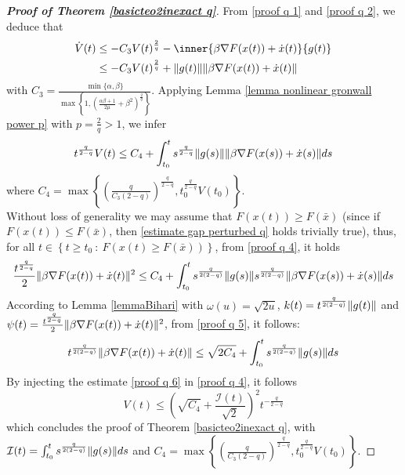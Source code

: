 \documentclass[reqno]{amsart}
\theoremstyle{plain}
\theoremstyle{definition}
\theoremstyle{remark}
\DeclarePairedDelimiter{\norm}{\lVert}{\rVert}	%
\newcommand{\Ib}{\mathcal{I}}
\begin{document}
\begin{proof}[\textbf{Proof of Theorem \ref{basicteo2inexact q}}]
	From \eqref{proof q 1} and \eqref{proof q 2}, we deduce that	
	\begin{equation}\label{proof q 3}
		\begin{aligned}
			\dot{V}(t) & \leq -C_{3}V(t)^{\frac{2}{q}}  -\inner{\beta\nabla F(x(t))+\dot{x}(t)}{g(t)} \\
			& \leq -C_{3}V(t)^{\frac{2}{q}} + \norm{g(t)}\norm{\beta\nabla F(x(t))+\dot{x}(t)}
		\end{aligned}
	\end{equation}
	with $C_{3}=\frac{\min\{\alpha,\beta\}}{\max\left\{1,\left(\frac{\alpha\beta+1}{2\mu }+\beta^{2}\right)^{\frac{2}{q}}\right\}}$.	
	Applying Lemma \ref{lemma nonlinear gronwall power p} with $p=\frac{2}{q}>1$, we infer
	\begin{equation}\label{proof q 4}
		t^{\frac{q}{2-q}}V(t) \leq  C_{4}+ \int_{t_{0}}^{t}s^{\frac{q}{2-q}}\norm{g(s)}\norm{\beta\nabla F(x(s))+\dot{x}(s)}ds
	\end{equation}
	where $C_{4} = \max\left\{\left(\frac{q}{C_{3}(2-q)}\right)^{\frac{q}{2-q}} , t_{0}^{\frac{q}{2-q}}V(t_{0})\right\}$.\\
	Without loss of generality we may assume that $F(x(t)) \geq F(\bar{x})$ (since if $F(x(t)) \leq F(\bar{x})$, then \eqref{estimate gap perturbed q} holds trivially true), thus, for all $t\in \left\{t\geq t_{0}~:~F(x(t) \geq F(\bar{x}))\right\}$, from \eqref{proof q 4}, it holds
	\begin{equation}\label{proof q 5}
		\frac{t^{\frac{q}{2-q}}}{2}\norm{\beta\nabla F(x(t))+\dot{x}(t)}^{2} \leq  C_{4}+ \int_{t_{0}}^{t}s^{\frac{q}{2(2-q)}}\norm{g(s)}s^{\frac{q}{2(2-q)}}\norm{\beta\nabla F(x(s))+\dot{x}(s)}ds
	\end{equation}
	According to Lemma \ref{lemmaBihari} with $\omega(u)=\sqrt{2u}$, $k(t)=t^{\frac{q}{2(2-q)}}\norm{g(t)}$ and $\psi(t) = \frac{t^{\frac{q}{2-q}}}{2}\norm{\beta\nabla F(x(t))+\dot{x}(t)}^{2}$, from \eqref{proof q 5}, it follows:
	\begin{equation}\label{proof q 6}
		t^{\frac{q}{2(2-q)}}\norm{\beta\nabla F(x(t))+\dot{x}(t)} \leq \sqrt{2C_{4}} +\int_{t_{0}}^{t}s^{\frac{q}{2(2-q)}}\norm{g(s)}ds
	\end{equation}
	By injecting the estimate \eqref{proof q 6} in \eqref{proof q 4}, it follows
	\begin{equation}
		V(t) \leq  \left(\sqrt{C_{4}} +\frac{\Ib(t)}{\sqrt{2}}\right)^{2}t^{-\frac{q}{2-q}}
	\end{equation}
	which concludes the proof of Theorem \ref{basicteo2inexact q}, with $\Ib(t)=\int_{t_{0}}^{t}s^{\frac{q}{2(2-q)}}\norm{g(s)}ds$ and $C_{4} = \max\left\{\left(\frac{q}{C_{3}(2-q)}\right)^{\frac{q}{2-q}} , t_{0}^{\frac{q}{2-q}}V(t_{0})\right\}$.
\end{proof}
\end{document}
